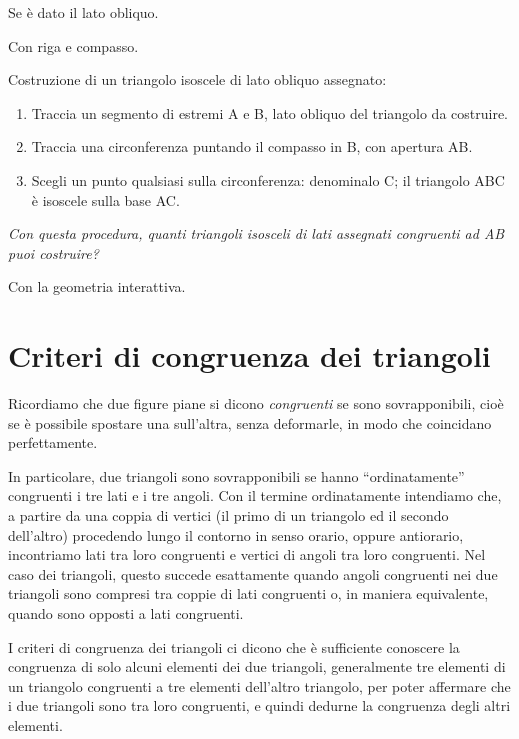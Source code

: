 Se è dato il lato obliquo.

Con riga e compasso.

 \begin{procedura}
   Costruzione di un triangolo isoscele di lato obliquo assegnato:
   \begin{enumerate} [nosep]
     \item 
     Traccia un segmento di estremi A e B, lato obliquo del triangolo da 
costruire.  
     \item 
     Traccia una circonferenza puntando il compasso in B, con apertura AB.  
     \item 
     Scegli un punto qualsiasi sulla circonferenza: denominalo C; il triangolo 
ABC è isoscele sulla base AC.  
   \end{enumerate}
   \textit{ Con questa procedura, quanti triangoli isosceli di lati assegnati 
congruenti ad AB puoi costruire?}  
 \end{procedura}

\ifcoding
Con la geometria interattiva.

\fi

\section{Criteri di congruenza dei triangoli}
\label{sect:primo_secondo_criterio_di_congruenza_triangoli}

Ricordiamo che due figure piane si dicono \emph{congruenti} se sono 
sovrapponibili, cioè se è possibile spostare una sull'altra, senza 
deformarle, in modo che coincidano perfettamente. 

In particolare, due triangoli sono sovrapponibili se hanno 
``ordinatamente'' congruenti i tre lati e i tre angoli. Con il 
termine ordinatamente intendiamo che, a partire da una coppia di 
vertici (il primo di un triangolo ed il secondo dell'altro) procedendo 
lungo il contorno in senso orario, oppure antiorario, incontriamo lati 
tra loro congruenti e vertici di angoli tra loro congruenti. Nel caso 
dei triangoli, questo succede esattamente quando angoli congruenti nei 
due triangoli sono compresi tra coppie di lati congruenti o, in 
maniera equivalente, quando sono opposti a lati congruenti.

I criteri di congruenza dei triangoli ci dicono che è sufficiente 
conoscere la congruenza di solo alcuni elementi dei due triangoli, 
generalmente tre elementi di un triangolo congruenti a tre elementi 
dell'altro triangolo, per poter affermare che i due triangoli sono 
tra loro congruenti, e quindi dedurne la congruenza degli altri 
elementi.

